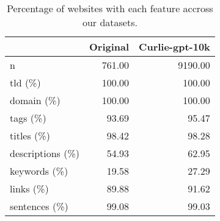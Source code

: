 \begin{table}[!ht]
\centering
\caption{Percentage of websites with each feature accross our datasets.}
\label{tab:feature_information}
\begin{tabular}{lrr}
\toprule
 & Original & Curlie-gpt-10k \\
\midrule
n & 761.00 & 9190.00 \\
tld (\%) & 100.00 & 100.00 \\
domain (\%) & 100.00 & 100.00 \\
tags (\%) & 93.69 & 95.47 \\
titles (\%) & 98.42 & 98.28 \\
descriptions (\%) & 54.93 & 62.95 \\
keywords (\%) & 19.58 & 27.29 \\
links (\%) & 89.88 & 91.62 \\
sentences (\%) & 99.08 & 99.03 \\
\bottomrule
\end{tabular}
\end{table}
